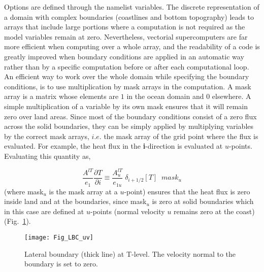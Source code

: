 \documentclass[NEMO_book]{subfiles}
\begin{document}
Options are defined through the  namelist variables.
The discrete representation of a domain with complex boundaries (coastlines and 
bottom topography) leads to arrays that include large portions where a computation 
is not required as the model variables remain at zero. Nevertheless, vectorial 
supercomputers are far more efficient when computing over a whole array, and the 
readability of a code is greatly improved when boundary conditions are applied in 
an automatic way rather than by a specific computation before or after each 
computational loop. An efficient way to work over the whole domain while specifying 
the boundary conditions, is to use multiplication by mask arrays in the computation. 
A mask array is a matrix whose elements are $1$ in the ocean domain and $0$ 
elsewhere. A simple multiplication of a variable by its own mask ensures that it will 
remain zero over land areas. Since most of the boundary conditions consist of a 
zero flux across the solid boundaries, they can be simply applied by multiplying 
variables by the correct mask arrays, $i.e.$ the mask array of the grid point where 
the flux is evaluated. For example, the heat flux in the \textbf{i}-direction is evaluated 
at $u$-points. Evaluating this quantity as,

\begin{equation} \label{Eq_lbc_aaaa}
\frac{A^{lT} }{e_1 }\frac{\partial T}{\partial i}\equiv \frac{A_u^{lT} 
}{e_{1u} } \; \delta _{i+1 / 2} \left[ T \right]\;\;mask_u 
\end{equation}
(where mask$_{u}$ is the mask array at a $u$-point) ensures that the heat flux is 
zero inside land and at the boundaries, since mask$_{u}$ is zero at solid boundaries 
which in this case are defined at $u$-points (normal velocity $u$ remains zero at 
the coast) (Fig.~\ref{Fig_LBC_uv}). 

\begin{figure}[!t]     \begin{center}
\texttt{[image: Fig\_LBC\_uv]}
\caption{  \label{Fig_LBC_uv}
Lateral boundary (thick line) at T-level. The velocity normal to the boundary is set to zero.}
\end{center}   \end{figure}
\end{document}
